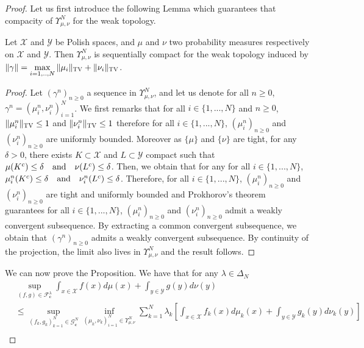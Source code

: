 \begin{proof}
\label{prv:dual-reformulation}
Let us first introduce the following Lemma which guarantees that compacity of  $\Upsilon^N_{\mu,\nu}$ for the weak topology.
\begin{lemma}
\label{lemma:weak-topo-dual-dual}
Let $\mathcal{X}$ and $\mathcal{Y}$ be Polish spaces, and $\mu$ and $\nu$ two probability measures respectively on  $\mathcal{X}$ and $\mathcal{Y}$. Then $\Upsilon^N_{\mu,\nu}$  is sequentially compact for the weak topology induced by $\Vert \gamma \Vert = \max\limits_{i=1,..,N} \Vert \mu_i\Vert_{\textsc{TV}} + \Vert \nu_i\Vert_{\textsc{TV}} $. 
\end{lemma}


\begin{proof}
Let $(\gamma^n)_{n\geq 0}$ a sequence in $\Upsilon^N_{\mu,\nu}$, and let us denote for all $n\geq 0$, $\gamma^n=(\mu^n_i,\nu^n_i)_{i=1}^N$. We first remarks that for all $i\in\{1,...,N\}$ and $n\geq 0$, $\Vert \mu_i^n\Vert_{\textsc{TV}} \leq 1$ and $\Vert \nu_i^n\Vert_{\textsc{TV}} \leq 1$ therefore for all $i\in\{1,...,N\}$, $(\mu^n_i)_{n\geq 0}$ and $(\nu^n_i)_{n\geq 0}$  are uniformly bounded. Moreover as $\{\mu\}$ and $\{\nu\}$ are tight, for any $\delta>0$, there exists $K\subset \mathcal{X} $ and $L\subset \mathcal{Y}$ compact such that $\mu(K^c)\leq \delta \text{\quad and\quad }  \nu(L^c)\leq \delta$. Then, we obtain that for any for all $i\in\{1,...,N\}$, $\mu_i^n(K^c)\leq \delta \text{\quad and\quad }  \nu_i^n(L^c)\leq \delta$.
Therefore, for all $i\in\{1,...,N\}$,  $(\mu_i^n)_{n\geq 0}$ and $(\nu_i^n)_{n\geq 0}$ are tight and uniformly bounded and Prokhorov's theorem~\citep[Theorem A.3.15]{dupuis2011weak} guarantees for all $i\in\{1,...,N\}$,  $(\mu_i^n)_{n\geq 0}$ and $(\nu_i^n)_{n\geq 0}$ admit a weakly convergent subsequence. By extracting a common convergent subsequence, we obtain that $(\gamma^n)_{n\geq 0}$ admits a weakly convergent subsequence. By continuity of the projection, the limit also lives in $\Upsilon
^N_{\mu,\nu}$ and the result follows.
\end{proof}
We can now prove the Proposition. We have that for any $\lambda\in\Delta_N$
\begin{align*}
      &\sup\limits_{(f,g)\in\mathcal{F}_{\mathbf{c}}^{\lambda}} \int_{x\in\mathcal{X}} f(x)d\mu(x)+ \int_{y\in\mathcal{Y}} g(y)d\nu(y)\\
  &\leq \sup\limits_{(f_k,g_k)_{k=1}^N\in  \mathcal{G}^{N}_{\mathbf{c}}} \inf_{(\mu_k,\nu_k)_{i=1}^N\in\Upsilon_{\mu,\nu}^N } \sum_{k=1}^N \lambda_k \left[\int_{x\in\mathcal{X}} f_k(x)d\mu_k(x)+ \int_{y\in\mathcal{Y}} g_k(y)d\nu_k(y)\right]\\

\end{align*}
\end{proof}
